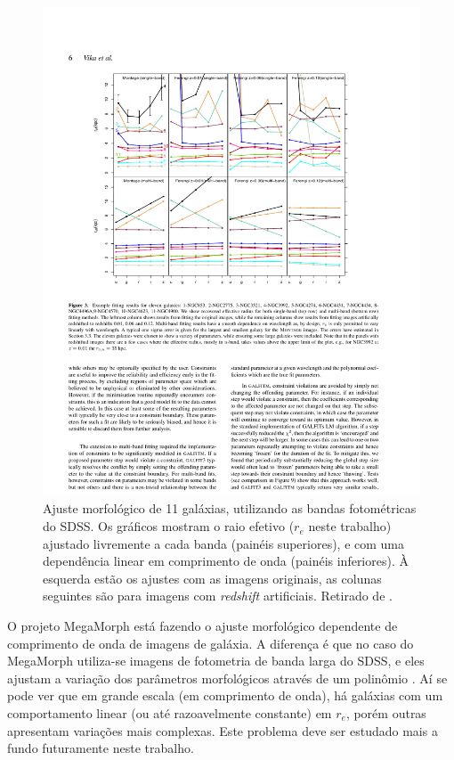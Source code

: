 \begin{figure}
	\includegraphics{figuras/vika-properties}
	\caption[Ajuste morfológico de bandas fotométricas] {Ajuste
	morfológico de 11 galáxias, utilizando as bandas fotométricas do
	SDSS. Os gráficos mostram o raio efetivo ($r_e$ neste trabalho) ajustado
	livremente a cada banda (painéis superiores), e com uma dependência linear em
	comprimento de onda (painéis inferiores). À esquerda estão os ajustes com as
	imagens originais, as colunas seguintes são para imagens com {\em redshift}
	artificiais. Retirado de \citet{Vika2013}.}
	\label{fig:propertiesVika}
\end{figure}

\TODO O projeto MegaMorph \citep{Haussler2013} está fazendo o ajuste morfológico
dependente de comprimento de onda de imagens de galáxia. A diferença é que no
caso do MegaMorph utiliza-se imagens de fotometria de banda larga do SDSS, e
eles ajustam a variação dos parâmetros morfológicos através de um polinômio
\citep[Figura \ref{fig:propertiesVika}]{Vika2013}. Aí se pode ver que em grande
escala (em comprimento de onda), há galáxias com um comportamento linear (ou até
razoavelmente constante) em $r_e$, porém outras apresentam variações mais
complexas. Este problema deve ser estudado mais a fundo futuramente neste
trabalho.

